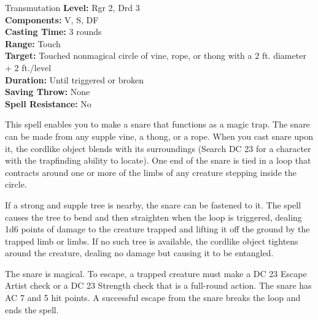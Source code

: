 {Transmutation}
{
	\textbf{Level:}
	Rgr 2, Drd 3\\
	\textbf{Components:}
	V, S, DF\\
	\textbf{Casting Time:}
	3 rounds\\
	\textbf{Range:}
	Touch\\
	\textbf{Target:}
	Touched nonmagical circle of vine, rope, or thong with a 2 ft. diameter + 2 ft./level\\
	\textbf{Duration:}
	Until triggered or broken\\
	\textbf{Saving Throw:}
	None\\
	\textbf{Spell Resistance:}
	No\\
}
{
	This spell enables you to make a snare that functions as a magic trap. The snare can be made from any supple vine, a thong, or a rope. When you cast snare upon it, the cordlike object blends with its surroundings (Search DC 23 for a character with the trapfinding ability to locate). One end of the snare is tied in a loop that contracts around one or more of the limbs of any creature stepping inside the circle.

	If a strong and supple tree is nearby, the snare can be fastened to it. The spell causes the tree to bend and then straighten when the loop is triggered, dealing 1d6 points of damage to the creature trapped and lifting it off the ground by the trapped limb or limbs. If no such tree is available, the cordlike object tightens around the creature, dealing no damage but causing it to be entangled.

	The snare is magical. To escape, a trapped creature must make a DC 23 Escape Artist check or a DC 23 Strength check that is a full-round action. The snare has AC 7 and 5 hit points. A successful escape from the snare breaks the loop and ends the spell.

}
